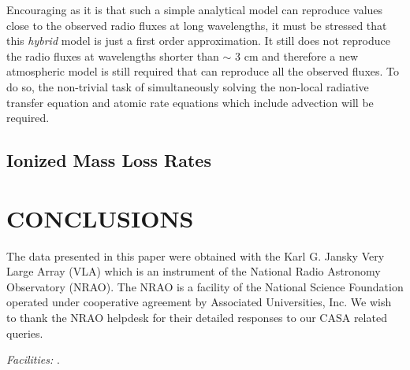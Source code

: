\documentclass[iop]{emulateapj}
\begin{document}
Encouraging as it is that such a simple analytical model can reproduce values close to the observed radio fluxes at long wavelengths, it must be stressed that this \textit{hybrid} model is just a first order approximation. It still does not reproduce the radio fluxes at wavelengths shorter than $\sim$ 3 cm and therefore a new atmospheric model is still required that can reproduce all the observed fluxes. To do so, the non-trivial task of simultaneously solving the non-local radiative transfer equation and atomic rate equations which include advection will be required.


\subsection{Ionized Mass Loss Rates} \label{disc5}

\section{CONCLUSIONS}


\acknowledgments
The data presented in this paper were obtained with the Karl G. Jansky Very Large Array (VLA) which is an instrument of the National Radio Astronomy Observatory (NRAO). The NRAO is a facility of the National Science Foundation operated under cooperative agreement by Associated Universities, Inc. We wish to thank the NRAO helpdesk for their detailed responses to our CASA related queries.

{\it Facilities:} .




\end{document}
